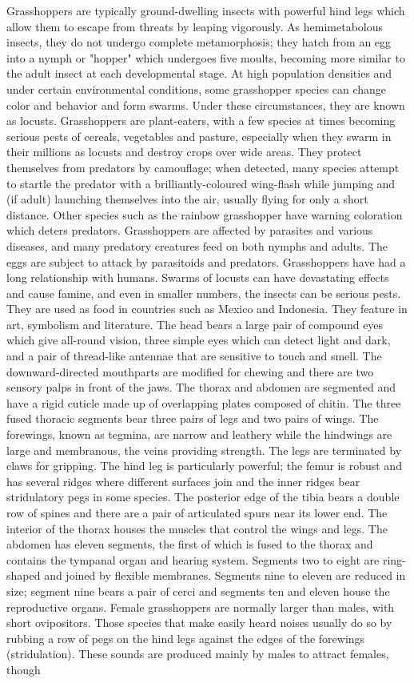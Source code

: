 \documentclass[twoside, 12pt, letterpaper]{report}\usepackage[]{graphicx}\usepackage[]{color}
\begin{document}
\begin{multicols*}{2}
\nsubsection{\hopper}
Grasshoppers are typically ground-dwelling insects with powerful hind legs which allow them to escape from threats by leaping vigorously. As hemimetabolous insects, they do not undergo complete metamorphosis; they hatch from an egg into a nymph or "hopper" which undergoes five moults, becoming more similar to the adult insect at each developmental stage. At high population densities and under certain environmental conditions, some grasshopper species can change color and behavior and form swarms. Under these circumstances, they are known as locusts. Grasshoppers are plant-eaters, with a few species at times becoming serious pests of cereals, vegetables and pasture, especially when they swarm in their millions as locusts and destroy crops over wide areas. They protect themselves from predators by camouflage; when detected, many species attempt to startle the predator with a brilliantly-coloured wing-flash while jumping and (if adult) launching themselves into the air, usually flying for only a short distance. Other species such as the rainbow grasshopper have warning coloration which deters predators. Grasshoppers are affected by parasites and various diseases, and many predatory creatures feed on both nymphs and adults. The eggs are subject to attack by parasitoids and predators. Grasshoppers have had a long relationship with humans. Swarms of locusts can have devastating effects and cause famine, and even in smaller numbers, the insects can be serious pests. They are used as food in countries such as Mexico and Indonesia. They feature in art, symbolism and literature. The head bears a large pair of compound eyes which give all-round vision, three simple eyes which can detect light and dark, and a pair of thread-like antennae that are sensitive to touch and smell. The downward-directed mouthparts are modified for chewing and there are two sensory palps in front of the jaws. The thorax and abdomen are segmented and have a rigid cuticle made up of overlapping plates composed of chitin. The three fused thoracic segments bear three pairs of legs and two pairs of wings. The forewings, known as tegmina, are narrow and leathery while the hindwings are large and membranous, the veins providing strength. The legs are terminated by claws for gripping. The hind leg is particularly powerful; the femur is robust and has several ridges where different surfaces join and the inner ridges bear stridulatory pegs in some species. The posterior edge of the tibia bears a double row of spines and there are a pair of articulated spurs near its lower end. The interior of the thorax houses the muscles that control the wings and legs. The abdomen has eleven segments, the first of which is fused to the thorax and contains the tympanal organ and hearing system. Segments two to eight are ring-shaped and joined by flexible membranes. Segments nine to eleven are reduced in size; segment nine bears a pair of cerci and segments ten and eleven house the reproductive organs. Female grasshoppers are normally larger than males, with short ovipositors. Those species that make easily heard noises usually do so by rubbing a row of pegs on the hind legs against the edges of the forewings (stridulation). These sounds are produced mainly by males to attract females, though 
\end{multicols*}
\end{document}
